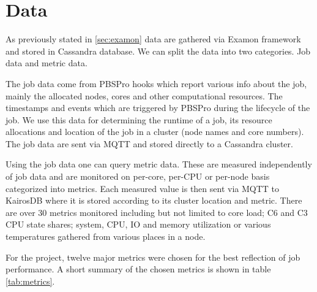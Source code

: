\section{Data}
\label{sec:data}

As previously stated in \ref{sec:examon} data are gathered via Examon framework and stored in Cassandra database. We can split the data into two categories. Job data and metric data.

The job data come from PBSPro hooks which report various info about the job, mainly the allocated nodes, cores and other computational resources. The timestamps and events which are triggered by PBSPro during the lifecycle of the job. We use this data for determining the runtime of a job, its resource allocations and location of the job in a cluster (node names and core numbers). The job data are sent via MQTT and stored directly to a Cassandra cluster.

Using the job data one can query metric data. These are measured independently of job data and are monitored on per-core, per-CPU or per-node basis categorized into metrics. Each measured value is then sent via MQTT to KairosDB where it is stored according to its cluster location and metric. There are over 30 metrics monitored including but not limited to core load; C6 and C3 CPU state shares; system, CPU, IO and memory utilization or various temperatures gathered from various places in a node.

For the project, twelve major metrics were chosen for the best reflection of job performance. A short summary of the chosen metrics is shown in table \ref{tab:metrics}.

